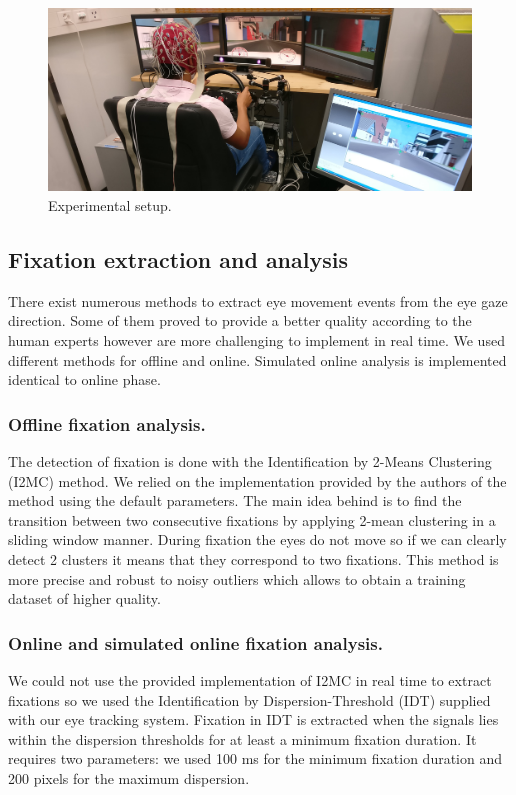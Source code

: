 \documentclass[12pt]{iopart}
\begin{document}
\begin{figure}[!t]
    \includegraphics[trim={0cm 0cm 0cm 0cm},clip,width=0.6\columnwidth]{../images/Driving-photo.jpg}
    \caption{Experimental setup.}
\label{fig:setup}
\end{figure}

\subsection{Fixation extraction and analysis}
There exist numerous methods to extract eye movement events
from the eye gaze direction. Some of them proved to provide
a better quality according to the human experts
however are more challenging to implement in real time.
We used different methods for offline and online.
Simulated online analysis is implemented identical to online phase.


\subsubsection*{Offline fixation analysis.}
The detection of fixation is done with the Identification by 2-Means Clustering (I2MC) method.
We relied on the implementation provided by the authors of the method
using the default parameters.
The main idea behind is to find the transition between two consecutive fixations
by applying 2-mean clustering in a sliding window manner.
During fixation the eyes do not move so if we can clearly detect
2 clusters it means that they correspond to two fixations.
This method is more precise and robust to noisy outliers which
allows to obtain a training dataset of higher quality.

\subsubsection*{Online and simulated online fixation analysis.}
We could not use the provided implementation of I2MC in real time
to extract fixations so we used the Identification by Dispersion-Threshold (IDT)
supplied with our eye tracking system. Fixation in IDT is extracted
when the signals lies within the dispersion thresholds for at least a minimum fixation duration.
It requires two parameters: we used 100 ms for the minimum fixation duration
and 200 pixels for the maximum dispersion.
\end{document}
